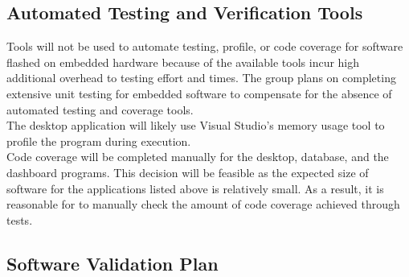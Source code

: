 \documentclass[12pt, titlepage]{article}
\begin{document}
\subsection{Automated Testing and Verification Tools}


  Tools will not be used to automate testing, profile, or code coverage for software flashed on embedded hardware because of the available tools incur high additional overhead to testing effort and times. The group plans on completing extensive unit testing for embedded software to compensate for the absence of automated testing and coverage tools.\\

  The desktop application will likely use Visual Studio's memory usage tool to profile the program during execution.\\

  Code coverage will be completed manually for the desktop, database, and the dashboard programs. This decision will be feasible as the expected size of software for the applications listed above is relatively small. As a result, it is reasonable for to manually check the amount of code coverage achieved through tests.\\


\subsection{Software Validation Plan}

\end{document}
